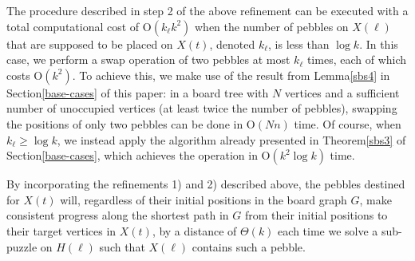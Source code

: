 \documentclass[letter,11pt]{article}
\theoremstyle{definition}
\theoremstyle{definition}
\newcommand{\1}{\boldmath$~1~$\unboldmath}
\newcommand{\Ord}{\mathrm{O}}
\newcommand{\tume}{\hspace*{0.2em}}
\begin{document}
The procedure described in step 2 of the above refinement can be executed with a total computational cost of $\Ord(k_{\ell} k^2)$
when the number of pebbles on $X(\ell)$ that are supposed to be placed on $X(t)$, denoted $k_{\ell}$, is less than $\log k$.
In this case, we perform a swap operation of two pebbles at most $k_{\ell}$ times, each of which costs $\Ord(k^2)$.
To achieve this, we make use of the result from Lemma\tume\ref{sbs4} in Section\tume\ref{base-cases} of this paper:
in a board tree with $N$ vertices and a sufficient number of unoccupied vertices (at least twice the number of pebbles),
swapping the positions of only two pebbles can be done in $\Ord(Nn)$ time. 
Of course, when $k_{\ell} \geq \log k$, we instead apply the algorithm already presented in Theorem\tume\ref{sbs3} of 
Section\tume\ref{base-cases}, which achieves the operation in $\Ord(k^2 \log k)$ time.

By incorporating the refinements 1) and 2) described above, the pebbles destined for $X(t)$ will, regardless of
their initial positions in the board graph $G$, make consistent progress along the shortest path in $G$ from their initial positions
to their target vertices in $X(t)$, by a distance of $\Theta(k)$ each time we solve a sub-puzzle on $H(\ell)$ such that $X(\ell)$
contains such a pebble. 
\end{document}
